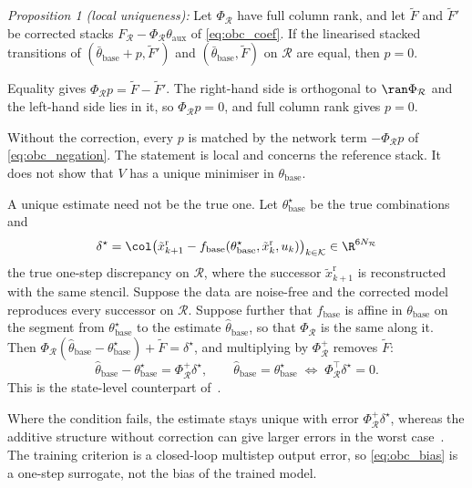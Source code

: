\noindent\textit{Proposition 1 (local uniqueness):} Let
$\Phi_{\mathcal R}$ have full column rank, and let $\tilde F$ and
$\tilde F'$ be corrected stacks
$F_{\mathcal R}-\Phi_{\mathcal R}\theta_{\mathrm{aux}}$ of
\eqref{eq:obc_coef}. If the linearised stacked transitions of
$(\bar\theta_{\mathrm{base}}+p,\tilde F')$ and
$(\bar\theta_{\mathrm{base}},\tilde F)$ on $\mathcal R$ are equal, then $p=0$.
\begin{IEEEproof}
Equality gives $\Phi_{\mathcal R}p=\tilde F-\tilde F'$. The right-hand side is
orthogonal to $\ran\Phi_{\mathcal R}$ and the left-hand side lies in it, so
$\Phi_{\mathcal R}p=0$, and full column rank gives $p=0$.
\end{IEEEproof}
Without the correction, every $p$ is matched by the network term
$-\Phi_{\mathcal R}p$ of \eqref{eq:obc_negation}.
The statement is local and concerns the reference stack.
It does not show that $V$ has a unique minimiser in $\theta_{\mathrm{base}}$.

A unique estimate need not be the true one.
Let $\theta^\star_{\mathrm{base}}$ be the true combinations and
\begin{equation}
 \delta^\star=\col\bigl(\tilde x^{\mathrm r}_{k+1}
 -f_{\mathrm{base}}(\theta^\star_{\mathrm{base}},\tilde x^{\mathrm r}_k,u_k)\bigr)_{k\in\mathcal K}
 \in\R^{6N_{\mathcal R}}
\label{eq:obc_delta}
\end{equation}
the true one-step discrepancy on $\mathcal R$, where the successor
$\tilde x^{\mathrm r}_{k+1}$ is reconstructed with the same stencil.
Suppose the data are noise-free and the corrected model reproduces every
successor on $\mathcal R$.
Suppose further that $f_{\mathrm{base}}$ is affine in $\theta_{\mathrm{base}}$
on the segment from $\theta^\star_{\mathrm{base}}$ to the estimate
$\hat\theta_{\mathrm{base}}$, so that $\Phi_{\mathcal R}$ is the same along it.
Then $\Phi_{\mathcal R}(\hat\theta_{\mathrm{base}}-\theta^\star_{\mathrm{base}})
+\tilde F=\delta^\star$, and multiplying by $\Phi_{\mathcal R}^{+}$ removes
$\tilde F$:
\begin{equation}
 \hat\theta_{\mathrm{base}}-\theta^\star_{\mathrm{base}}
 =\Phi_{\mathcal R}^{+}\delta^\star,
 \qquad
 \hat\theta_{\mathrm{base}}=\theta^\star_{\mathrm{base}}
 \;\Longleftrightarrow\;
 \Phi_{\mathcal R}^{\top}\delta^\star=0.
\label{eq:obc_bias}
\end{equation}
This is the state-level counterpart of~\cite[Cond.~4, Thm.~7,
Eq.~(21)]{gyorok2026obc}.

Where the condition fails, the estimate stays unique with error
$\Phi_{\mathcal R}^{+}\delta^\star$, whereas the additive structure without
correction can give larger errors in the worst
case~\cite[Sec.~4.2]{gyorok2026obc}.
The training criterion is a closed-loop multistep output error, so
\eqref{eq:obc_bias} is a one-step surrogate, not the bias of the trained
model.

